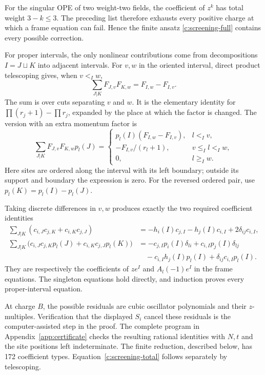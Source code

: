 \documentclass[11pt,a4paper]{article}
\numberwithin{equation}{section}
\theoremstyle{definition}\newtheorem{definition}[theorem]{Definition}
\theoremstyle{remark}\newtheorem{remark}[theorem]{Remark}
\begin{document}
For the singular OPE of two weight-two fields, the coefficient of $z^k$ has total weight $3-k\le3$. The preceding list therefore exhausts every positive charge at which a frame equation can fail. Hence the finite ansatz \eqref{c:screening-full} contains every
possible correction.

For proper intervals, the only nonlinear contributions come from decompositions $I=J\sqcup K$ into adjacent intervals. For $v,w$ in the oriented interval, direct product telescoping gives, when $v<_I w$,
\[
 \sum_{J|K}F_{J,v}F_{K,w}=F_{I,w}-F_{I,v}.
\]
The sum is over cuts separating $v$ and $w$. It is the elementary identity for $\prod(r_j+1)-\prod r_j$, expanded by the place at which the factor is changed. The version with an extra momentum factor is
\[
 \sum_{J|K}F_{J,v}F_{K,w}p_l(J)=
 \begin{cases}
 p_l(I)(F_{I,w}-F_{I,v}),&l<_I v,\\
 -F_{I,v}/(r_l+1),&v\le_I l<_I w,\\
 0,&l\ge_I w.
 \end{cases}
\]
Here sites are ordered along the interval with its left boundary; outside its support and boundary the expression is zero. For the reversed ordered pair, use $p_l(K)=p_l(I)-p_l(J)$.

Taking discrete differences in $v,w$ produces exactly the two required coefficient identities
\begin{align*}
 \sum_{J|K}(c_{i,J}c_{j,K}+c_{i,K}c_{j,J})
 &=-h_i(I)c_{j,I}-h_j(I)c_{i,I}+2\delta_{ij}c_{i,I},\\
 \sum_{J|K}\big(c_{i,J}c_{j,K}p_l(J)+c_{i,K}c_{j,J}p_l(K)\big)
 &=-c_{j,I}p_i(I)\delta_{li}+c_{i,I}p_j(I)\delta_{lj}\\
 &\quad-c_{i,I}h_j(I)p_l(I)+\delta_{ij}c_{i,I}p_l(I).
\end{align*}
They are respectively the coefficients of $z e^I$ and $A_l(-1)e^I$ in the frame equations. The singleton equations hold directly, and induction proves every proper-interval equation.

At charge $B$, the possible residuals are cubic oscillator polynomials
and their $z$-multiples. Verification that the displayed $S_i$ cancel
these residuals is the computer-assisted step in the proof. The complete
program in Appendix~\ref{app:certificate} checks the resulting rational
identities with $N,t$ and the site positions left indeterminate. The
finite reduction, described below, has 172 coefficient types.
Equation~\eqref{c:screening-total} follows separately by telescoping.
\end{document}
